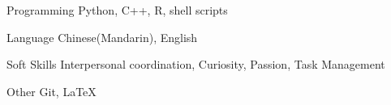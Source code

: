 

\begin{cvskills}

  \cvskill
    {Programming} %
    {Python, C++, R, shell scripts} %
    
  \cvskill
    {Language} %
    {Chinese(Mandarin), English} %
    
  \cvskill
    {Soft Skills} %
    {Interpersonal coordination, Curiosity, Passion, Task Management} %
    
  \cvskill
    {Other} %
    {Git, \LaTeX} %

\end{cvskills}
